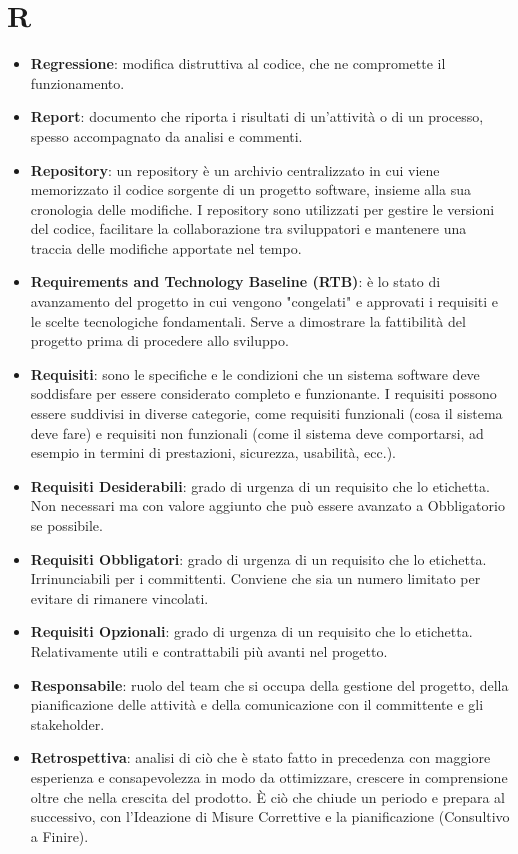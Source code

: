\documentclass[a4paper,12pt]{article}
\begin{document}
\section{R}
\begin{itemize}
    \item \textbf{Regressione}: modifica distruttiva al codice, che ne compromette il funzionamento. 
    \item \textbf{Report}: documento che riporta i risultati di un'attività o di un processo, spesso accompagnato da analisi e commenti.
    \item \textbf{Repository}: un repository è un archivio centralizzato in cui viene memorizzato il codice sorgente di un progetto software, insieme alla sua cronologia delle modifiche. I repository sono utilizzati per gestire le versioni del codice, facilitare la collaborazione tra sviluppatori e mantenere una traccia delle modifiche apportate nel tempo.
    \item \textbf{Requirements and Technology Baseline (RTB)}: è lo stato di avanzamento del progetto in cui vengono "congelati" e approvati i requisiti e le scelte tecnologiche fondamentali. Serve a dimostrare la fattibilità del progetto prima di procedere allo sviluppo. 
    \item \textbf{Requisiti}: sono le specifiche e le condizioni che un sistema software deve soddisfare per essere considerato completo e funzionante. I requisiti possono essere suddivisi in diverse categorie, come requisiti funzionali (cosa il sistema deve fare) e requisiti non funzionali (come il sistema deve comportarsi, ad esempio in termini di prestazioni, sicurezza, usabilità, ecc.).
    \item \textbf{Requisiti Desiderabili}: grado di urgenza di un requisito che lo etichetta. Non necessari ma con valore aggiunto che può essere avanzato a Obbligatorio se possibile.
    \item \textbf{Requisiti Obbligatori}: grado di urgenza di un requisito che lo etichetta. Irrinunciabili per i committenti. Conviene che sia un numero limitato per evitare di rimanere vincolati.
    \item \textbf{Requisiti Opzionali}: grado di urgenza di un requisito che lo etichetta. Relativamente utili e contrattabili più avanti nel progetto.
    \item \textbf{Responsabile}: ruolo del team che si occupa della gestione del progetto, della pianificazione delle attività e della comunicazione con il committente e gli stakeholder.
    \item \textbf{Retrospettiva}: analisi di ciò che è stato fatto in precedenza con maggiore esperienza e consapevolezza in modo da ottimizzare, crescere in comprensione oltre che nella crescita del prodotto. È ciò che chiude un periodo e prepara al successivo, con l'Ideazione di Misure Correttive e la pianificazione (Consultivo a Finire).

\end{itemize}
\end{document}
